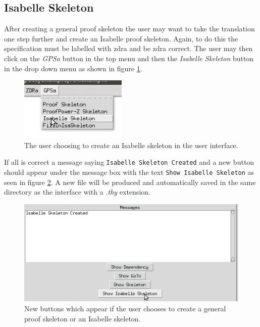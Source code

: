 \subsection{Isabelle Skeleton}

After creating a general proof skeleton the user may want to take the
translation one step further and create an Isabelle proof skeleton. Again, to do
this the specification must be labelled with \gls{zdra} and be \gls{zdra}
correct. The user may then click on the \emph{GPSa} button in the top menu and
then the \emph{Isabelle Skeleton} button in the drop down menu as shown in
figure \ref{fig:converttoisa}.

\begin{figure}[H]
\centering
\includegraphics[scale=0.5]{Figures/Interface/isskeleton.png}
\caption{The user choosing to create an Isabelle skeleton in the user interface. \label{fig:converttoisa}}
\end{figure}

If all is correct a message saying \texttt{Isabelle Skeleton Created} and a new
button should appear under the message box with the text \texttt{Show Isabelle
Skeleton} as seen in figure \ref{fig:showskeleton}. A new file will be produced
and automatically saved in the same directory as the interface with a
\emph{.thy} extension.

\begin{figure}[H]
\centering
\includegraphics[scale=0.5]{Figures/Interface/showsaskeleton.png}
\caption{New buttons which appear if the user chooses to create a general proof skeleton or an Isabelle skeleton. \label{fig:showskeleton}}
\end{figure}

